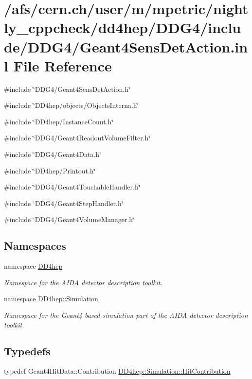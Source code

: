 \hypertarget{_geant4_sens_det_action_8inl}{
\section{/afs/cern.ch/user/m/mpetric/nightly\_\-cppcheck/dd4hep/DDG4/include/DDG4/Geant4SensDetAction.inl File Reference}
\label{_geant4_sens_det_action_8inl}
}
{\ttfamily \#include \char`\"{}DDG4/Geant4SensDetAction.h\char`\"{}}\par
{\ttfamily \#include \char`\"{}DD4hep/objects/ObjectsInterna.h\char`\"{}}\par
{\ttfamily \#include \char`\"{}DD4hep/InstanceCount.h\char`\"{}}\par
{\ttfamily \#include \char`\"{}DDG4/Geant4ReadoutVolumeFilter.h\char`\"{}}\par
{\ttfamily \#include \char`\"{}DDG4/Geant4Data.h\char`\"{}}\par
{\ttfamily \#include \char`\"{}DD4hep/Printout.h\char`\"{}}\par
{\ttfamily \#include \char`\"{}DDG4/Geant4TouchableHandler.h\char`\"{}}\par
{\ttfamily \#include \char`\"{}DDG4/Geant4StepHandler.h\char`\"{}}\par
{\ttfamily \#include \char`\"{}DDG4/Geant4VolumeManager.h\char`\"{}}\par
\subsection*{Namespaces}
\begin{DoxyCompactItemize}
\item 
namespace \hyperlink{namespace_d_d4hep}{DD4hep}


\begin{DoxyCompactList}\small\item\em Namespace for the AIDA detector description toolkit. \item\end{DoxyCompactList}\item 
namespace \hyperlink{namespace_d_d4hep_1_1_simulation}{DD4hep::Simulation}


\begin{DoxyCompactList}\small\item\em Namespace for the Geant4 based simulation part of the AIDA detector description toolkit. \item\end{DoxyCompactList}\end{DoxyCompactItemize}
\subsection*{Typedefs}
\begin{DoxyCompactItemize}
\item 
typedef Geant4HitData::Contribution \hyperlink{namespace_d_d4hep_1_1_simulation_af3e4b03fc6b6e8a0ed0cba9dbf6c1f69}{DD4hep::Simulation::HitContribution}
\end{DoxyCompactItemize}
